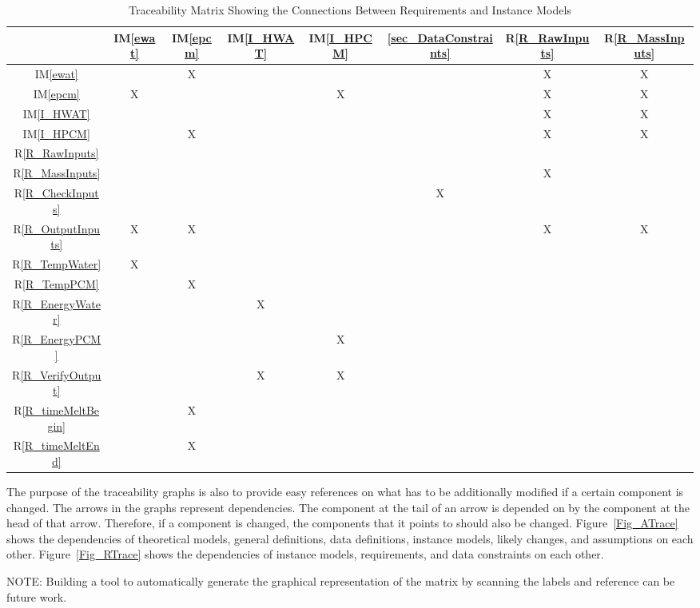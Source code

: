 \documentclass[12pt]{article}
\newcommand{\iref}[1]{IM\ref{#1}}
\newcommand{\rref}[1]{R\ref{#1}}
\begin{document}
\begin{table}[h!]
\centering
\begin{tabular}{|c|c|c|c|c|c|c|c|}
\hline
	& \iref{ewat}& \iref{epcm}& \iref{I_HWAT}& \iref{I_HPCM}& \ref{sec_DataConstraints}& \rref{R_RawInputs}& \rref{R_MassInputs} \\
\hline
\iref{ewat}            & & X& & & & X& X \\ \hline
\iref{epcm}            & X& & & X& & X& X \\ \hline
\iref{I_HWAT}          & & & & & & X& X \\ \hline
\iref{I_HPCM}          & & X& & & & X& X \\ \hline
\rref{R_RawInputs}     & & & & & & & \\ \hline
\rref{R_MassInputs}    & & & & & & X& \\ \hline
\rref{R_CheckInputs}   & & & & & X& & \\ \hline
\rref{R_OutputInputs}  & X& X& & & & X& X \\ \hline
\rref{R_TempWater}     & X& & & & & & \\ \hline 
\rref{R_TempPCM}       & & X& & & & & \\ \hline
\rref{R_EnergyWater}   & & & X& & & & \\ \hline
\rref{R_EnergyPCM}     & & & & X& & & \\ \hline
\rref{R_VerifyOutput}  & & & X& X& & & \\ \hline
\rref{R_timeMeltBegin} & & X& & & & & \\ \hline
\rref{R_timeMeltEnd}   & & X& & & & & \\ 
\hline
\end{tabular}
\caption{Traceability Matrix Showing the Connections Between Requirements and Instance Models}
\label{Table:R_trace}
\end{table}

The purpose of the traceability graphs is also to provide easy references on what has to be additionally modified if a certain component is changed.  The arrows in the graphs represent dependencies. The component at the tail of an arrow is depended on by the component at the head of that arrow. Therefore, if a component is changed, the components that it points to should also be changed. Figure~\ref{Fig_ATrace} shows the dependencies of theoretical models, general definitions, data definitions, 
instance models, likely changes, and assumptions on each other. Figure~\ref{Fig_RTrace} shows the dependencies of instance models, requirements, and data constraints on each other.\par
NOTE: Building a tool to automatically generate the graphical 
representation of the matrix by scanning the labels and reference can be 
future work.
\end{document}
